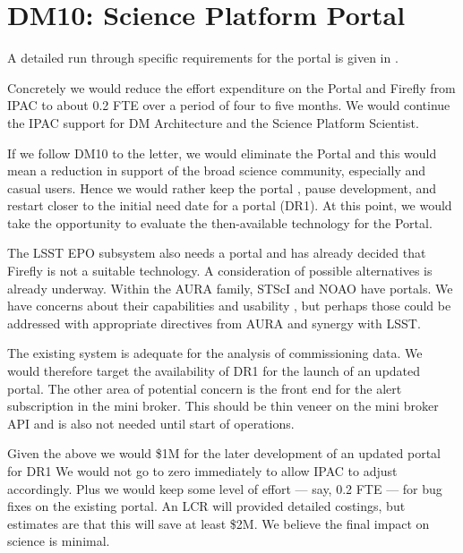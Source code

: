 \section{DM10: Science Platform Portal}\label{sect:dm10}

A detailed run through specific requirements for the portal is given in .

Concretely we would reduce the effort expenditure on the Portal and Firefly from IPAC to about 0.2 FTE over a period of four to five months.
We would continue the IPAC support for DM Architecture and the Science Platform Scientist.

If we follow DM10 to the letter, we would eliminate the Portal and this would mean a reduction in support of the broad science community, 
especially   and casual users.
Hence we would rather keep the portal  , pause development, and  restart closer 
to the initial need date for a portal (DR1).
At this point, we would take the opportunity to evaluate the then-available technology for the Portal.

The LSST EPO subsystem also needs a portal and has already decided that
Firefly is not a suitable technology. A consideration of possible alternatives
is already underway.
Within the AURA family, STScI and NOAO have portals.
We have concerns about their capabilities and usability
,
but perhaps those could be addressed with appropriate directives from AURA and synergy with LSST.

The existing system is adequate for the analysis of commissioning data.
We would therefore target the availability of DR1 for the launch of an updated
portal.
The other area of potential concern is the front end for the alert subscription in the mini broker.
This should be  thin veneer on the mini broker API and is also not needed until start of operations.

Given the above we would  \$1M for the later development of an updated portal for DR1
We would not go to zero immediately to allow IPAC to adjust accordingly.
Plus we would keep some level of effort --- say, 0.2 FTE --- for bug fixes on the existing portal.
An LCR will provided detailed costings, but   estimates are that this will save at least \$2M.
We believe the final impact on science is minimal.
